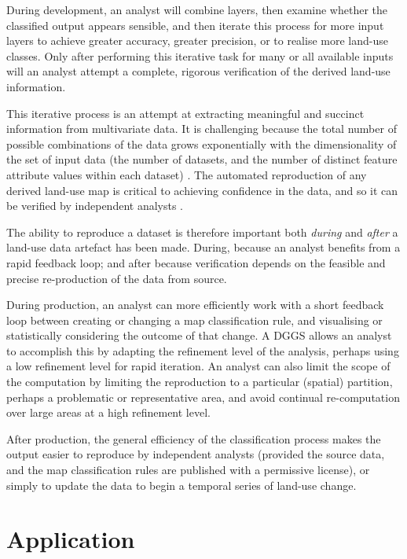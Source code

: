 \documentclass[]{interact}
\theoremstyle{plain}%
\theoremstyle{definition}
\theoremstyle{remark}
\begin{document}
During development, an analyst will combine layers, then examine whether the classified output appears sensible, and then iterate this process for more input layers to achieve greater accuracy, greater precision, or to realise more land-use classes. Only after performing this iterative task for many or all available inputs will an analyst attempt a complete, rigorous verification of the derived land-use information. 

This iterative process is an attempt at extracting meaningful and succinct information from multivariate data. It is challenging because the total number of possible combinations of the data grows exponentially with the dimensionality of the set of input data (the number of datasets, and the number of distinct feature attribute values within each dataset) \citep{behrisch2014feedback}. The automated reproduction of any derived land-use map is critical to achieving confidence in the data, and so it can be verified by independent analysts \citep{etherington2022,baker2016}.

The ability to reproduce a dataset is therefore important both \textit{during} and \textit{after} a land-use data artefact has been made. During, because an analyst benefits from a rapid feedback loop; and after because verification depends on the feasible and precise re-production of the data from source.

During production, an analyst can more efficiently work with a short feedback loop between creating or changing a map classification rule, and visualising or statistically considering the outcome of that change. A \ac{DGGS} allows an analyst to accomplish this by adapting the refinement level of the analysis, perhaps using a low refinement level for rapid iteration. An analyst can also limit the scope of the computation by limiting the reproduction to a particular (spatial) partition, perhaps a problematic or representative area, and avoid continual re-computation over large areas at a high refinement level.

After production, the general efficiency of the classification process makes the output easier to reproduce by independent analysts (provided the source data, and the map classification rules are published with a permissive license), or simply to update the data to begin a temporal series of land-use change.

\section{Application} %
\end{document}
